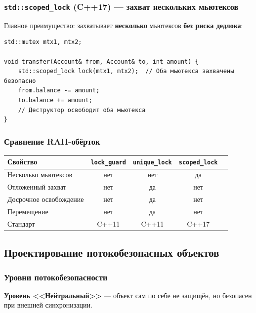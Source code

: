 \documentclass[a4paper,12pt]{article}
\begin{document}
\subsubsection{\texttt{std::scoped\_lock} (C++17) --- захват нескольких мьютексов}

Главное преимущество: захватывает \textbf{несколько} мьютексов \textbf{без риска дедлока}:

\begin{lstlisting}
std::mutex mtx1, mtx2;

void transfer(Account& from, Account& to, int amount) {
    std::scoped_lock lock(mtx1, mtx2);  // Оба мьютекса захвачены безопасно
    from.balance -= amount;
    to.balance += amount;
    // Деструктор освободит оба мьютекса
}
\end{lstlisting}

\subsubsection{Сравнение RAII-обёрток}

\begin{center}
\begin{tabular}{lcccc}
\toprule
\textbf{Свойство} & \texttt{lock\_guard} & \texttt{unique\_lock} & \texttt{scoped\_lock} \\
\midrule
Несколько мьютексов   & нет & нет & да  \\
Отложенный захват     & нет & да  & нет \\
Досрочное освобождение & нет & да  & нет \\
Перемещение           & нет & да  & нет \\
Стандарт              & C++11 & C++11 & C++17 \\
\bottomrule
\end{tabular}
\end{center}

\subsection{Проектирование потокобезопасных объектов}

\subsubsection{Уровни потокобезопасности}

\textbf{Уровень <<Нейтральный>>} --- объект сам по себе не защищён, но безопасен
при внешней синхронизации.
\end{document}
